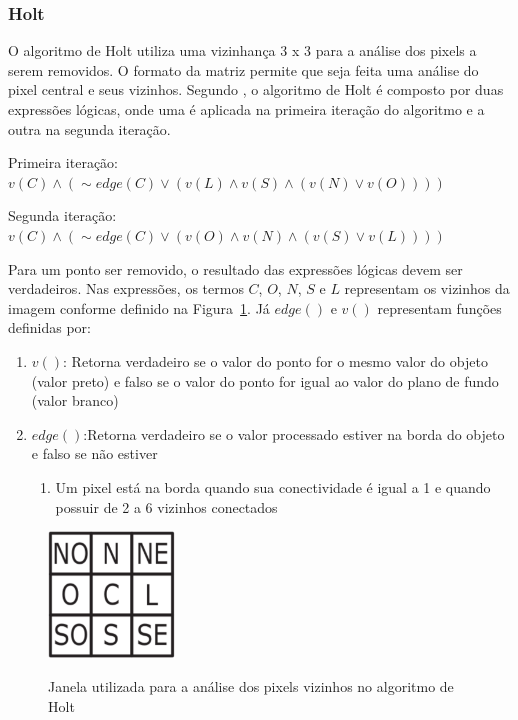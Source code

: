 \documentclass[12pt,oneside,a4paper,english,french,spanish,brazil,]{abntex2}
\begin{document}
\subsubsection{Holt}

O algoritmo de Holt \cite{holt:1987} utiliza uma vizinhança 3 x 3 para a análise dos pixels a serem removidos. O formato da matriz permite que seja feita uma análise do pixel central e seus vizinhos. Segundo \citet{guilherme:2007}, o algoritmo de Holt é composto por duas expressões lógicas, onde uma é aplicada na primeira iteração do algoritmo e a outra na segunda iteração.


Primeira iteração: 
\(v(C) \wedge (\sim edge(C) \vee (v(L) \wedge v(S) \wedge (v(N) \vee v(O))))\)

Segunda iteração:
\(v(C) \wedge (\sim edge(C) \vee (v(O) \wedge v(N) \wedge (v(S) \vee v(L))))\)

Para um ponto ser removido, o resultado das expressões lógicas devem ser verdadeiros. Nas expressões, os termos \(C\), \(O\), \(N\), \(S\) e \(L\) representam os vizinhos da imagem conforme definido na Figura~\ref{fig:PDI_Holt_1}. Já \(edge()\) e \(v()\) representam funções definidas por:
\begin{enumerate}
\item \(v()\): Retorna verdadeiro se o valor do ponto for o mesmo valor do objeto (valor preto) e falso se o valor do ponto for igual ao valor do plano de fundo (valor branco)
\item \(edge()\):Retorna verdadeiro se o valor processado estiver na borda do objeto e falso se não estiver
\begin{enumerate}[label*=\roman*.]
    \item Um pixel está na borda quando sua conectividade é igual a 1 e quando possuir de 2 a 6 vizinhos conectados
  \end{enumerate}
\end{enumerate}

\begin{figure}[ht]
\centering
\caption{Janela utilizada para a análise dos pixels vizinhos no algoritmo de Holt}
\includegraphics[width=0.3\textwidth]{imagens/PDI_Holt_1.PNG}
\label{fig:PDI_Holt_1}
\end{figure}
\end{document}
